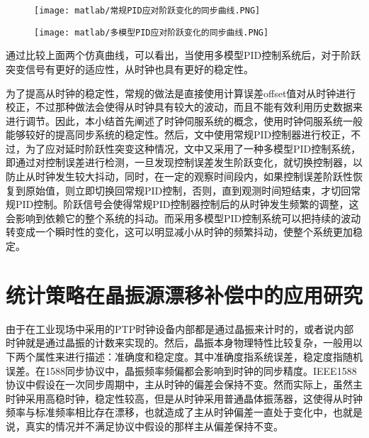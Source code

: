 \begin{figure}[htbp]
  \centering
  \begin{minipage}[b]{0.7\textwidth}
   \captionstyle{\centering}
   \centering
   \texttt{[image: matlab/常规PID应对阶跃变化的同步曲线.PNG]}
  \end{minipage}     
\end{figure}

\begin{figure}[htbp]
  \centering
  \begin{minipage}[b]{0.7\textwidth}
   \captionstyle{\centering}
   \centering
   \texttt{[image: matlab/多模型PID应对阶跃变化的同步曲线.PNG]}
  \end{minipage}     
\end{figure}

通过比较上面两个仿真曲线，可以看出，当使用多模型PID控制系统后，对于阶跃突变信号有更好的适应性，从时钟也具有更好的稳定性。

为了提高从时钟的稳定性，常规的做法是直接使用计算误差offset值对从时钟进行校正，不过那种做法会使得从时钟具有较大的波动，而且不能有效利用历史数据来进行调节。因此，本小结首先阐述了时钟伺服系统的概念，使用时钟伺服系统一般能够较好的提高同步系统的稳定性。然后，文中使用常规PID控制器进行校正，不过，为了应对延时阶跃性突变这种情况，文中又采用了一种多模型PID控制系统，即通过对控制误差进行检测，一旦发现控制误差发生阶跃变化，就切换控制器，以防止从时钟发生较大抖动，同时，在一定的观察时间段内，如果控制误差阶跃性恢复到原始值，则立即切换回常规PID控制，否则，直到观测时间短结束，才切回常规PID控制。阶跃信号会使得常规PID控制器控制后的从时钟发生频繁的调整，这会影响到依赖它的整个系统的抖动。而采用多模型PID控制系统可以把持续的波动转变成一个瞬时性的变化，这可以明显减小从时钟的频繁抖动，使整个系统更加稳定。

\section{统计策略在晶振源漂移补偿中的应用研究}
由于在工业现场中采用的PTP时钟设备内部都是通过晶振来计时的，或者说内部时钟就是通过晶振的计数来实现的。然后，晶振本身物理特性比较复杂，一般用以下两个属性来进行描述：准确度和稳定度。其中准确度指系统误差，稳定度指随机误差。在1588同步协议中，晶振频率频偏都会影响到时钟的同步精度。IEEE1588协议中假设在一次同步周期中，主从时钟的偏差会保持不变。然而实际上，虽然主时钟采用高稳时钟，稳定性较高，但是从时钟采用普通晶体振荡器，这使得从时钟频率与标准频率相比存在漂移，也就造成了主从时钟偏差一直处于变化中，也就是说，真实的情况并不满足协议中假设的那样主从偏差保持不变。


